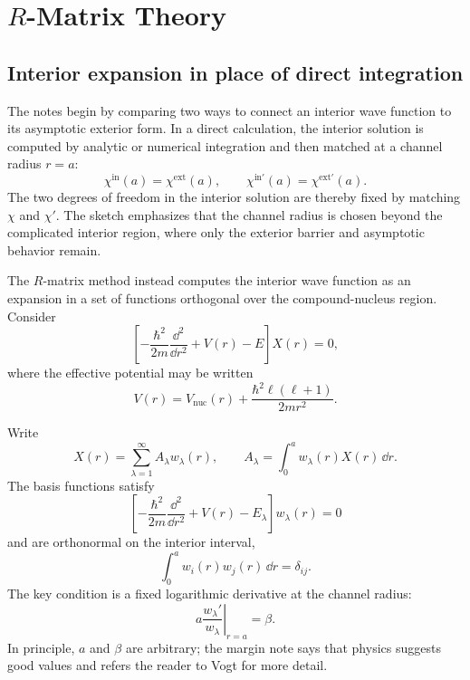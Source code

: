 \chapter{\texorpdfstring{$R$}{R}-Matrix Theory}

\section{Interior expansion in place of direct integration}
The notes begin by comparing two ways to connect an interior wave function to its asymptotic exterior form.  In a direct calculation, the interior solution is computed by analytic or numerical integration and then matched at a channel radius $r=a$:
\[
  \chi^{\mathrm{in}}(a)=\chi^{\mathrm{ext}}(a),
  \qquad
  \chi^{\mathrm{in}\prime}(a)=\chi^{\mathrm{ext}\prime}(a).
\]
The two degrees of freedom in the interior solution are thereby fixed by matching $\chi$ and $\chi'$.  The sketch emphasizes that the channel radius is chosen beyond the complicated interior region, where only the exterior barrier and asymptotic behavior remain.

The $R$-matrix method instead computes the interior wave function as an expansion in a set of functions orthogonal over the compound-nucleus region.  Consider
\begin{equation}
  \left[
    -\frac{\hbar^2}{2m}\frac{\dd^2}{\dd r^2}
    +V(r)-E
  \right]X(r)=0,
  \label{eq:rmat-physical-radial}
\end{equation}
where the effective potential may be written
\[
  V(r)=V_{\mathrm{nuc}}(r)
  +\frac{\hbar^2\ell(\ell+1)}{2mr^2}.
\]

Write
\begin{equation}
  X(r)=\sum_{\lambda=1}^{\infty}A_\lambda w_\lambda(r),
  \qquad
  A_\lambda=\int_0^a w_\lambda(r)X(r)\,\dd r.
  \label{eq:rmat-expansion}
\end{equation}
The basis functions satisfy
\begin{equation}
  \left[
    -\frac{\hbar^2}{2m}\frac{\dd^2}{\dd r^2}
    +V(r)-E_\lambda
  \right]w_\lambda(r)=0
  \label{eq:rmat-basis-eqn}
\end{equation}
and are orthonormal on the interior interval,
\[
  \int_0^a w_i(r)w_j(r)\,\dd r=\delta_{ij}.
\]
The key condition is a fixed logarithmic derivative at the channel radius:
\begin{equation}
  \left.a\frac{w_\lambda'}{w_\lambda}\right|_{r=a}=\beta.
  \label{eq:rmat-fixed-boundary}
\end{equation}
In principle, $a$ and $\beta$ are arbitrary; the margin note says that physics suggests good values and refers the reader to Vogt for more detail.


